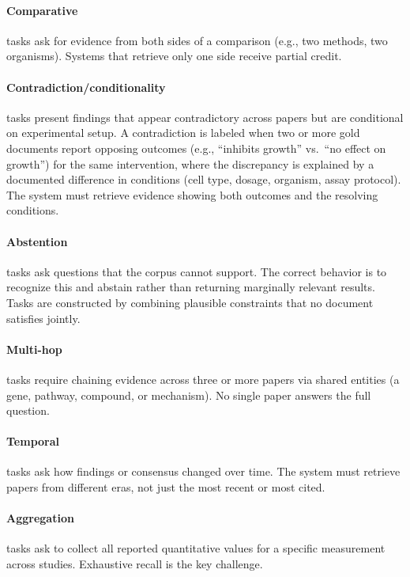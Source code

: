 \documentclass{article}
\begin{document}
\paragraph{Comparative} tasks ask for evidence from both sides of a comparison (e.g., two methods, two organisms). Systems that retrieve only one side receive partial credit.

\paragraph{Contradiction/conditionality} tasks present findings that appear contradictory across papers but are conditional on experimental setup. A contradiction is labeled when two or more gold documents report opposing outcomes (e.g., ``inhibits growth'' vs.\ ``no effect on growth'') for the same intervention, where the discrepancy is explained by a documented difference in conditions (cell type, dosage, organism, assay protocol). The system must retrieve evidence showing both outcomes and the resolving conditions.

\paragraph{Abstention} tasks ask questions that the corpus cannot support. The correct behavior is to recognize this and abstain rather than returning marginally relevant results. Tasks are constructed by combining plausible constraints that no document satisfies jointly.

\paragraph{Multi-hop} tasks require chaining evidence across three or more papers via shared entities (a gene, pathway, compound, or mechanism). No single paper answers the full question.

\paragraph{Temporal} tasks ask how findings or consensus changed over time. The system must retrieve papers from different eras, not just the most recent or most cited.

\paragraph{Aggregation} tasks ask to collect all reported quantitative values for a specific measurement across studies. Exhaustive recall is the key challenge.
\end{document}
